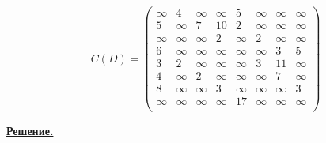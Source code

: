 \documentclass[12pt, letterpaper, titlepage]{article}
\begin{document}
\[
    C(D)=
    \begin{pmatrix}
        \infty & 4      & \infty & \infty & 5      & \infty & \infty & \infty \\
        5      & \infty & 7      & 10     & 2      & \infty & \infty & \infty \\
        \infty & \infty & \infty & 2      & \infty & 2      & \infty & \infty \\
        6      & \infty & \infty & \infty & \infty & \infty & 3      & 5      \\
        3      & 2      & \infty & \infty & \infty & 3      & 11     & \infty \\
        4      & \infty & 2      & \infty & \infty & \infty & 7      & \infty \\
        8      & \infty & \infty & 3      & \infty & \infty & \infty & 3      \\
        \infty & \infty & \infty & \infty & 17     & \infty & \infty & \infty \\
    \end{pmatrix}
\]

\underline{\textbf{Решение.}}
\end{document}
